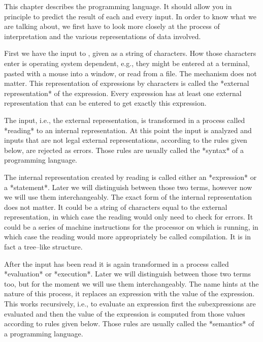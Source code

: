 %
%
%
%
%
%

This chapter describes the {\GAP} programming language.  It should allow
you in principle to predict the result of each and every input. In order
to know what we are talking about, we first have to look more closely at
the process of interpretation and the various representations of data
involved.

First we have the input to {\GAP}, given as a string of characters. How
those characters enter {\GAP} is operating system dependent, e.g., they
might be entered at a terminal, pasted with a mouse into a window, or
read from a file. The mechanism does not matter. This representation of
expressions by characters is called the *external representation* of the
expression. Every expression has at least one external representation
that can be entered to get exactly this expression.

The input, i.e., the external representation, is transformed in a process
called *reading* to an internal representation.  At this point the input
is analyzed and inputs  that are not legal external representations,
according to the rules given below, are rejected as errors. Those rules
are usually called the *syntax* of a programming language.

The internal representation created by reading is called either an
*expression* or a *statement*.  Later we will distinguish between those
two terms, however now we will use them interchangeably. The exact form
of the internal representation does not matter. It could be a string of
characters equal to the external representation, in which case the
reading would only need to check for errors. It could be a series of
machine instructions for the processor on which {\GAP} is running, in
which case the reading would more appropriately be called compilation.
It is in fact a tree--like structure.

After the input has been read it is again transformed in a process called
*evaluation* or *execution*. Later we will distinguish between those two
terms too, but for the moment we will use them interchangeably. The name
hints at the nature of this process, it replaces an expression with the
value of the expression. This works recursively, i.e., to evaluate an
expression first the subexpressions are evaluated and then the value of
the expression is computed from those values according to rules given below.
Those rules are usually called the *semantics* of a programming language.

